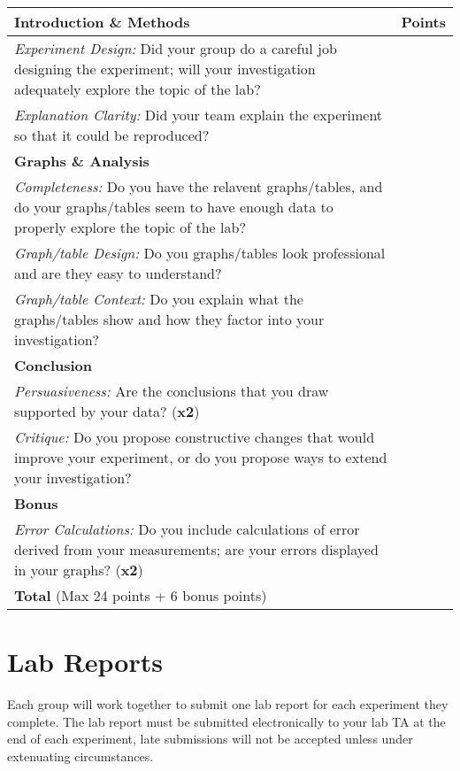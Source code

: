 \begin{table}[h]
	\centering
	\begin{tabular}{|p{13cm}|c|}
	\hline
	\textbf{Introduction \& Methods} & \textbf{Points} \\
	\hline
	\emph{Experiment Design:} Did your group do a careful job designing the experiment; will your investigation adequately explore the topic of the lab? &  \\
	\hline
	\emph{Explanation Clarity:} Did your team explain the experiment so that it could be reproduced? &  \\
	\hline
	\textbf{Graphs \& Analysis} &  \\
	\hline
	\emph{Completeness:} Do you have the relavent graphs/tables, and do your graphs/tables seem to have enough data to properly explore the topic of the lab?  &  \\
	\hline
	\emph{Graph/table Design:} Do you graphs/tables look professional and are they easy to understand? &  \\
	\hline
	\emph{Graph/table Context:} Do you explain what the graphs/tables show and how they factor into your investigation? &  \\
	\hline
	\textbf{Conclusion} &  \\
	\hline
	\emph{Persuasiveness:} Are the conclusions that you draw supported by your data? (\textbf{x2}) &  \\
	\hline
	\emph{Critique:} Do you propose constructive changes that would improve your experiment, or do you propose ways to extend your investigation? &  \\
	\hline
	\textbf{Bonus} &  \\
	\hline
	\emph{Error Calculations:} Do you include calculations of error derived from your measurements; are your errors displayed in your graphs? (\textbf{x2}) &  \\
	\hline
	\textbf{Total} (Max 24 points + 6 bonus points) &  \\
	\hline
	\end{tabular}
\end{table}

\newpage

\section*{Lab Reports}
Each group will work together to submit one lab report for each experiment they complete.
The lab report must be submitted electronically to your lab TA at the end of each experiment, late submissions will not be accepted unless under extenuating circumstances.

